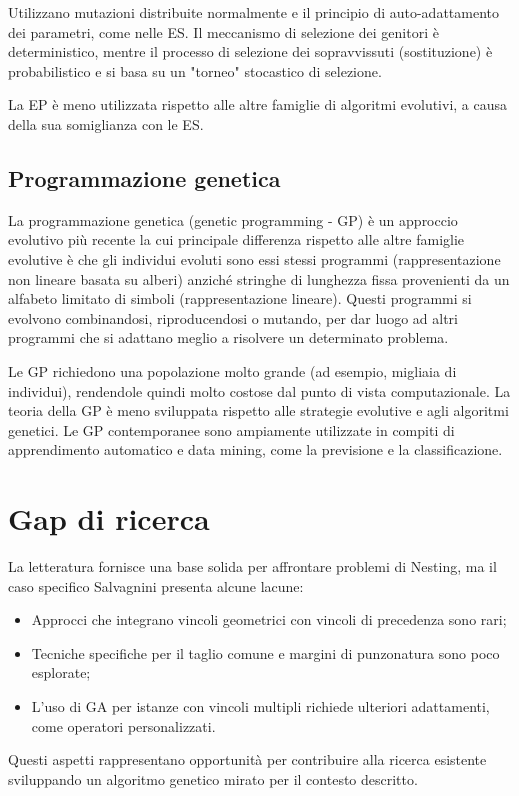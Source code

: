 Utilizzano mutazioni distribuite normalmente e il principio di auto-adattamento dei parametri, come nelle ES. Il meccanismo di selezione dei genitori è deterministico, mentre il processo di selezione dei sopravvissuti (sostituzione) è probabilistico e si basa su un "torneo" stocastico di selezione.

La EP è meno utilizzata rispetto alle altre famiglie di algoritmi evolutivi, a causa della sua somiglianza con le ES.

\subsection{Programmazione genetica}

La programmazione genetica (genetic programming - GP) è un approccio evolutivo più recente la cui principale differenza rispetto alle altre famiglie evolutive è che gli individui evoluti sono essi stessi programmi (rappresentazione non lineare basata su alberi) anziché stringhe di lunghezza fissa provenienti da un alfabeto limitato di simboli (rappresentazione lineare). Questi programmi si evolvono combinandosi, riproducendosi o mutando, per dar luogo ad altri programmi che si adattano meglio a risolvere un determinato problema.

Le GP richiedono una popolazione molto grande (ad esempio, migliaia di individui), rendendole quindi molto costose dal punto di vista computazionale. La teoria della GP è meno sviluppata rispetto alle strategie evolutive e agli algoritmi genetici. Le GP contemporanee sono ampiamente utilizzate in compiti di apprendimento automatico e data mining, come la previsione e la classificazione.

\section{Gap di ricerca}

La letteratura fornisce una base solida per affrontare problemi di Nesting, ma il caso specifico Salvagnini presenta alcune lacune:

\begin{itemize}
    \item Approcci che integrano vincoli geometrici con vincoli di precedenza sono rari;
    \item Tecniche specifiche per il taglio comune e margini di punzonatura sono poco esplorate;
    \item L'uso di GA per istanze con vincoli multipli richiede ulteriori adattamenti, come operatori personalizzati.
\end{itemize}

Questi aspetti rappresentano opportunità per contribuire alla ricerca esistente sviluppando un algoritmo genetico mirato per il contesto descritto.